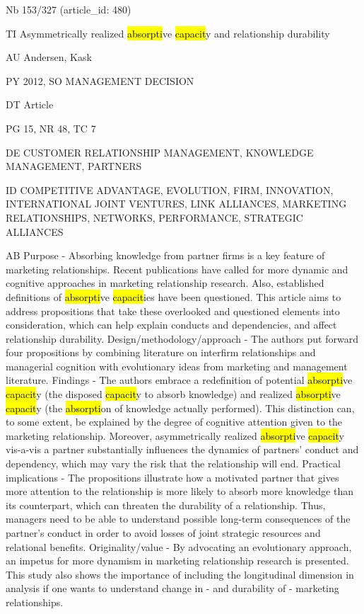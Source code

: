 \documentclass[a4paper]{article}
\begin{document}
\vspace*{-2cm}
Nb \tabto{0cm}153/327 (article\_id: 480)\par
TI \tabto{0cm}Asymmetrically realized \hl{absorpti}ve \hl{capacit}y and relationship durability\par
AU \tabto{0cm}Andersen, Kask\par
PY \tabto{0cm}2012, SO MANAGEMENT DECISION\par
DT \tabto{0cm}Article\par
PG \tabto{0cm}15, NR 48, TC 7\par
DE \tabto{0cm}CUSTOMER RELATIONSHIP MANAGEMENT, KNOWLEDGE MANAGEMENT, PARTNERS\par
ID \tabto{0cm}COMPETITIVE ADVANTAGE, EVOLUTION, FIRM, INNOVATION, INTERNATIONAL JOINT VENTURES, LINK ALLIANCES, MARKETING RELATIONSHIPS, NETWORKS, PERFORMANCE, STRATEGIC ALLIANCES\par
AB \tabto{0cm}Purpose - Absorbing knowledge from partner firms is a key feature of marketing relationships. Recent publications have called for more dynamic and cognitive approaches in marketing relationship research. Also, established definitions of \hl{absorpti}ve \hl{capacit}ies have been questioned. This article aims to address propositions that take these overlooked and questioned elements into consideration, which can help explain conducts and dependencies, and affect relationship durability.
Design/methodology/approach - The authors put forward four propositions by combining literature on interfirm relationships and managerial cognition with evolutionary ideas from marketing and management literature.
Findings - The authors embrace a redefinition of potential \hl{absorpti}ve \hl{capacit}y (the disposed \hl{capacit}y to absorb knowledge) and realized \hl{absorpti}ve \hl{capacit}y (the \hl{absorpti}on of knowledge actually performed). This distinction can, to some extent, be explained by the degree of cognitive attention given to the marketing relationship. Moreover, asymmetrically realized \hl{absorpti}ve \hl{capacit}y vis-a-vis a partner substantially influences the dynamics of partners' conduct and dependency, which may vary the risk that the relationship will end.
Practical implications - The propositions illustrate how a motivated partner that gives more attention to the relationship is more likely to absorb more knowledge than its counterpart, which can threaten the durability of a relationship. Thus, managers need to be able to understand possible long-term consequences of the partner's conduct in order to avoid losses of joint strategic resources and relational benefits.
Originality/value - By advocating an evolutionary approach, an impetus for more dynamism in marketing relationship research is presented. This study also shows the importance of including the longitudinal dimension in analysis if one wants to understand change in - and durability of - marketing relationships.\par
\clearpage
\end{document}
